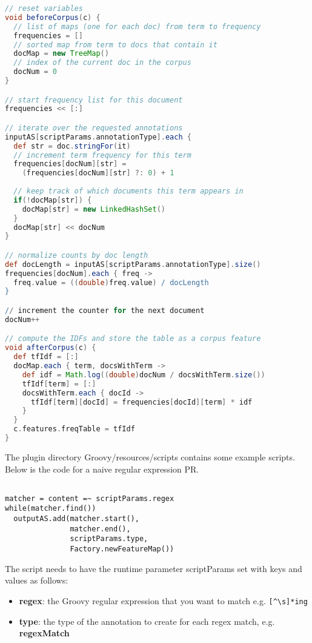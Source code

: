 \begin{lstlisting}[language=groovy]
// reset variables
void beforeCorpus(c) {
  // list of maps (one for each doc) from term to frequency
  frequencies = [] 
  // sorted map from term to docs that contain it
  docMap = new TreeMap()
  // index of the current doc in the corpus
  docNum = 0
}

// start frequency list for this document
frequencies << [:]

// iterate over the requested annotations
inputAS[scriptParams.annotationType].each {
  def str = doc.stringFor(it)
  // increment term frequency for this term
  frequencies[docNum][str] =
    (frequencies[docNum][str] ?: 0) + 1
  
  // keep track of which documents this term appears in
  if(!docMap[str]) {
    docMap[str] = new LinkedHashSet()
  }
  docMap[str] << docNum
}

// normalize counts by doc length
def docLength = inputAS[scriptParams.annotationType].size()
frequencies[docNum].each { freq ->
  freq.value = ((double)freq.value) / docLength
}

// increment the counter for the next document
docNum++

// compute the IDFs and store the table as a corpus feature
void afterCorpus(c) {
  def tfIdf = [:]
  docMap.each { term, docsWithTerm ->
    def idf = Math.log((double)docNum / docsWithTerm.size())
    tfIdf[term] = [:]
    docsWithTerm.each { docId ->
      tfIdf[term][docId] = frequencies[docId][term] * idf
    }
  }
  c.features.freqTable = tfIdf
}
\end{lstlisting}


The plugin directory Groovy/resources/scripts contains some example
scripts. Below is the code for a naive regular expression PR.

\begin{lstlisting}

matcher = content =~ scriptParams.regex
while(matcher.find())
  outputAS.add(matcher.start(),
               matcher.end(),
               scriptParams.type,
               Factory.newFeatureMap())

\end{lstlisting}

The script needs to have the runtime parameter scriptParams set with keys and
values as follows:

\begin{itemize}
\item \textbf{regex}: the Groovy regular expression that you want to match
  e.g. \verb=[^\s]*ing=
\item \textbf{type}: the type of the annotation to create for each regex
  match, e.g. \textbf{regexMatch}
\end{itemize}

